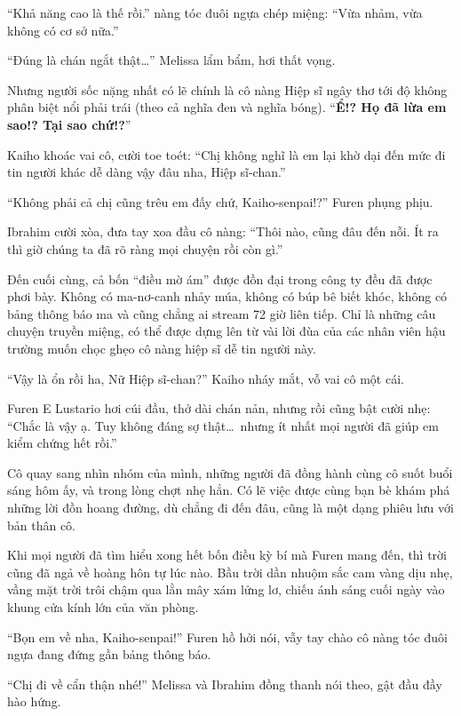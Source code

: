 \documentclass[../main.tex]{subfiles}
\begin{document}
``Khả năng cao là thế rồi.'' nàng tóc đuôi ngựa chép miệng: ``Vừa nhảm, vừa không có cơ sở nữa.''

``Đúng là chán ngắt thật\dots'' Melissa lẩm bẩm, hơi thất vọng.

Nhưng người sốc nặng nhất có lẽ chính là cô nàng Hiệp sĩ ngây thơ tới độ không phân biệt nổi phải trái (theo cả nghĩa đen và nghĩa bóng). ``\textbf{Ể!? Họ đã lừa em sao!? Tại sao chứ!?}''

Kaiho khoác vai cô, cười toe toét: ``Chị không nghĩ là em lại khờ dại đến mức đi tin người khác dễ dàng vậy đâu nha, Hiệp sĩ-chan.''

``Không phải cả chị cũng trêu em đấy chứ, Kaiho-senpai!?'' Furen phụng phịu.

Ibrahim cười xòa, đưa tay xoa đầu cô nàng: ``Thôi nào, cũng đâu đến nỗi. Ít ra thì giờ chúng ta đã rõ ràng mọi chuyện rồi còn gì.''

Đến cuối cùng, cả bốn ``điều mờ ám'' được đồn đại trong công ty đều đã được phơi bày. Không có ma-nơ-canh nhảy múa, không có búp bê biết khóc, không có bảng thông báo ma và cũng chẳng ai stream 72 giờ liên tiếp. Chỉ là những câu chuyện truyền miệng, có thể được dựng lên từ vài lời đùa của các nhân viên hậu trường muốn chọc ghẹo cô nàng hiệp sĩ dễ tin người này.

``Vậy là ổn rồi ha, Nữ Hiệp sĩ-chan?'' Kaiho nháy mắt, vỗ vai cô một cái.

Furen E Lustario hơi cúi đầu, thở dài chán nản, nhưng rồi cũng bật cười nhẹ: ``Chắc là vậy ạ. Tuy không đáng sợ thật\dots\ nhưng ít nhất mọi người đã giúp em kiểm chứng hết rồi.''

Cô quay sang nhìn nhóm của mình, những người đã đồng hành cùng cô suốt buổi sáng hôm ấy, và trong lòng chợt nhẹ hẳn. Có lẽ việc được cùng bạn bè khám phá những lời đồn hoang đường, dù chẳng đi đến đâu, cũng là một dạng phiêu lưu với bản thân cô.

\ct

Khi mọi người đã tìm hiểu xong hết bốn điều kỳ bí mà Furen mang đến, thì trời cũng đã ngả về hoàng hôn tự lúc nào. Bầu trời dần nhuộm sắc cam vàng dịu nhẹ, vầng mặt trời trôi chậm qua lằn mây xám lửng lơ, chiếu ánh sáng cuối ngày vào khung cửa kính lớn của văn phòng.

``Bọn em về nha, Kaiho-senpai!'' Furen hồ hởi nói, vẫy tay chào cô nàng tóc đuôi ngựa đang đứng gần bảng thông báo.

``Chị đi về cẩn thận nhé!'' Melissa và Ibrahim đồng thanh nói theo, gật đầu đầy hào hứng.
\end{document}
